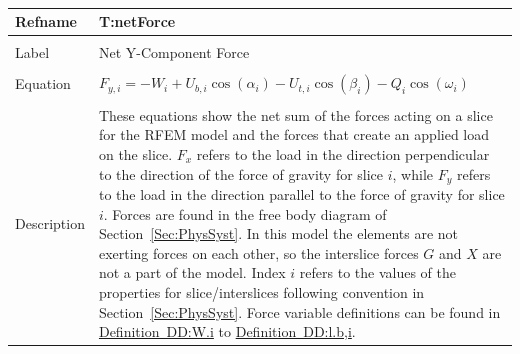 \documentclass[12pt]{article}
\begin{document}
~\newline
\noindent \begin{minipage}{\textwidth}
\begin{tabular}{p{} p{}}
\toprule \textbf{Refname} & \textbf{T:netForce}
\label{T:netForce}
\\ \midrule \\
Label & Net Y-Component Force
\\ \midrule \\
Equation & ${F_{y,i}}=-W_{i}+{U_{b,i}} \cos\left(α_{i}\right)-{U_{t,i}} \cos\left(β_{i}\right)-Q_{i} \cos\left(ω_{i}\right)$
\\ \midrule \\
Description & These equations show the net sum of the forces acting on a slice for the RFEM model and the forces that create an applied load on the slice. ${F_{x}}$ refers to the load in the direction perpendicular to the direction of the force of gravity for slice $i$, while ${F_{y}}$ refers to the load in the direction parallel to the force of gravity for slice $i$. Forces are found in the free body diagram of Section~\ref{Sec:PhysSyst}. In this model the elements are not exerting forces on each other, so the interslice forces $G$ and $X$ are not a part of the model. Index $i$ refers to the values of the properties for slice/interslices following convention in Section~\ref{Sec:PhysSyst}. Force variable definitions can be found in \hyperref[DD:W.i]{Definition~DD:W.i} to \hyperref[DD:l.b,i]{Definition~DD:l.b,i}.
\\ \bottomrule \end{tabular}
\end{minipage}\\
~\newline
\end{document}

